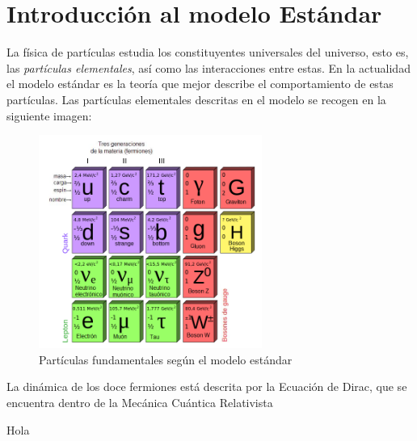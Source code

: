 
\chapter{Introducción al modelo Estándar}

La física de partículas estudia los constituyentes universales del universo, esto es, las \textit{partículas elementales}, así como las interacciones entre estas. En la actualidad el modelo estándar es la teoría que mejor describe el comportamiento de estas partículas. Las partículas elementales descritas en el modelo se recogen en la siguiente imagen:

\begin{figure}[h!] \centering
	\includegraphics[width=0.65\textwidth]{Cuerpo/Ch_00/1_01_Modelo_Estandar.png}
	\caption{Partículas fundamentales según el modelo estándar}
\end{figure}
La dinámica de los doce fermiones está descrita por la Ecuación de Dirac, que se encuentra dentro de la Mecánica Cuántica Relativista

\newpage

Hola 